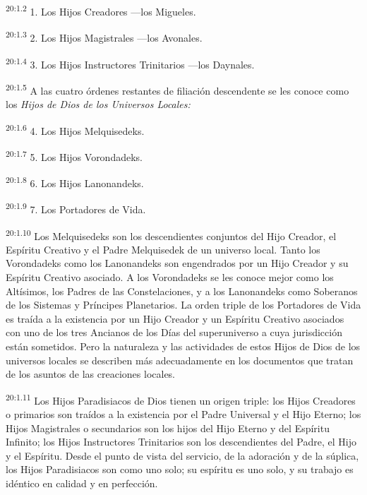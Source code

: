 \par
\textsuperscript{20:1.2} 1. Los Hijos Creadores ---los Migueles.

\par
\textsuperscript{20:1.3} 2. Los Hijos Magistrales ---los Avonales.

\par
\textsuperscript{20:1.4} 3. Los Hijos Instructores Trinitarios ---los Daynales.

\par
\textsuperscript{20:1.5} A las cuatro órdenes restantes de filiación descendente se les conoce como los \textit{Hijos de Dios de los Universos Locales:}

\par
\textsuperscript{20:1.6} 4. Los Hijos Melquisedeks.

\par
\textsuperscript{20:1.7} 5. Los Hijos Vorondadeks.

\par
\textsuperscript{20:1.8} 6. Los Hijos Lanonandeks.

\par
\textsuperscript{20:1.9} 7. Los Portadores de Vida.

\par
\textsuperscript{20:1.10} Los Melquisedeks son los descendientes conjuntos del Hijo Creador, el Espíritu Creativo y el Padre Melquisedek de un universo local. Tanto los Vorondadeks como los Lanonandeks son engendrados por un Hijo Creador y su Espíritu Creativo asociado. A los Vorondadeks se les conoce mejor como los Altísimos, los Padres de las Constelaciones, y a los Lanonandeks como Soberanos de los Sistemas y Príncipes Planetarios. La orden triple de los Portadores de Vida es traída a la existencia por un Hijo Creador y un Espíritu Creativo asociados con uno de los tres Ancianos de los Días del superuniverso a cuya jurisdicción están sometidos. Pero la naturaleza y las actividades de estos Hijos de Dios de los universos locales se describen más adecuadamente en los documentos que tratan de los asuntos de las creaciones locales.

\par
\textsuperscript{20:1.11} Los Hijos Paradisiacos de Dios tienen un origen triple: los Hijos Creadores o primarios son traídos a la existencia por el Padre Universal y el Hijo Eterno; los Hijos Magistrales o secundarios son los hijos del Hijo Eterno y del Espíritu Infinito; los Hijos Instructores Trinitarios son los descendientes del Padre, el Hijo y el Espíritu. Desde el punto de vista del servicio, de la adoración y de la súplica, los Hijos Paradisiacos son como uno solo; su espíritu es uno solo, y su trabajo es idéntico en calidad y en perfección.

